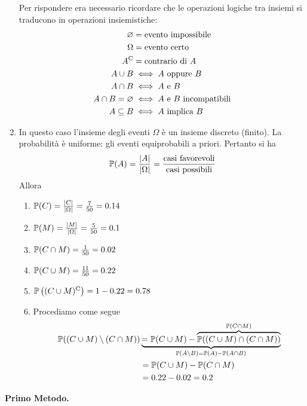 \begin{enumerate}
	Per rispondere era necessario ricordare che le operazioni logiche tra insiemi si traducono in operazioni insiemistiche:
	\begin{align*}
		\emptyset  & =\text{evento impossibile}\\
		\Omega  & =\text{evento certo}\\
		A\complementary & =\text{contrario di} \ A\\
		A\cup B & \iff A\ \text{oppure} \ B\\
		A\cap B & \iff A\ \text{e} \ B\\
		A\cap B=\emptyset  & \iff A\ \text{e} \ B\ \text{incompatibili}\\
		A\subseteq B & \iff A\ \text{implica} \ B
	\end{align*}
	\item In questo caso l'insieme degli eventi $\Omega $ è un insieme discreto (finito). La probabilità è uniforme: gli eventi equiprobabili a priori. Pertanto si ha
	\begin{equation*}
		\mathbb{P}(A) =\frac{| A| }{|\Omega| } =\frac{\text{casi favorevoli}}{\text{casi possibili}}
	\end{equation*}
	Allora
	\begin{enumerate}
		\item $\mathbb{P}( C) =\frac{| C| }{| \Omega | } =\frac{7}{50} =0.14$
		\item $\mathbb{P}( M) =\frac{| M| }{| \Omega | } =\frac{5}{50} =0.1$
		\item $\mathbb{P}( C\cap M) =\frac{1}{50} =0.02$
		\item $\mathbb{P}( C\cup M) =\frac{11}{50} =0.22$
		\item $\mathbb{P}\left(( C\cup M)^{\mathrm{C}}\right) =1-0.22=0.78$
		\item Procediamo come segue
		\begin{align*}
			\mathbb{P}((C\cup M) \setminus (C\cap M)) & \underbrace{=\mathbb{P}(C\cup M) -\overbrace{\mathbb{P}((C\cup M) \cap (C\cap M))}^{\mathbb{P}(C\cap M)}}_{\mathbb{P}(A\setminus B) =\mathbb{P}(A) -\mathbb{P}(A\cap B)}\\
			 & =\mathbb{P}(C\cup M) -\mathbb{P}(C\cap M)\\
			 & =0.22-0.02=0.2
		\end{align*}
	\end{enumerate}
\end{enumerate}

\Soluzione

\textbf{Primo Metodo.}

